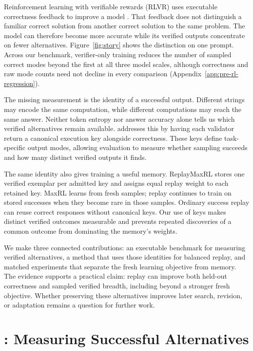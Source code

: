 Reinforcement learning with verifiable rewards (RLVR) uses executable
correctness feedback to improve a model \citep{guo2025deepseekr1}. That feedback
does not distinguish a familiar correct solution from another correct solution
to the same problem. The model can therefore become more accurate while its
verified outputs concentrate on fewer alternatives. Figure~\ref{fig:story}
shows the distinction on one prompt. Across our benchmark, verifier-only
training reduces the number of sampled correct modes beyond the first at all
three model scales, although correctness and raw mode counts need not decline
in every comparison (Appendix~\ref{app:pre-rl-regression}).

The missing measurement is the identity of a successful output. Different
strings may encode the same computation, while different computations may
reach the same answer. Neither token entropy nor answer accuracy alone tells
us which verified alternatives remain available. \mb{} addresses this by
having each validator return a canonical execution key alongside correctness.
These keys define task-specific output modes, allowing evaluation to measure whether sampling succeeds and how many
distinct verified outputs it finds.

The same identity also gives training a useful memory. ReplayMaxRL stores one
verified exemplar per admitted key and assigns equal replay weight to each
retained key. MaxRL learns from fresh samples; replay continues to train on
stored successes when they become rare in those samples. Ordinary success
replay can reuse correct responses without canonical keys. Our use of keys
makes distinct verified outcomes measurable and prevents repeated discoveries
of a common outcome from dominating the memory's weights.

We make three connected contributions: an executable benchmark for measuring
verified alternatives, a method that uses those identities for balanced replay,
and matched experiments that separate the fresh learning objective from memory.
The evidence supports a practical claim: replay can improve both held-out
correctness and sampled verified breadth, including beyond a stronger fresh
objective. Whether preserving these alternatives improves later search, revision, or
adaptation remains a question for further work.

\section{\mb: Measuring Successful Alternatives}
\label{sec:modebench}
\label{sec:collapse}

